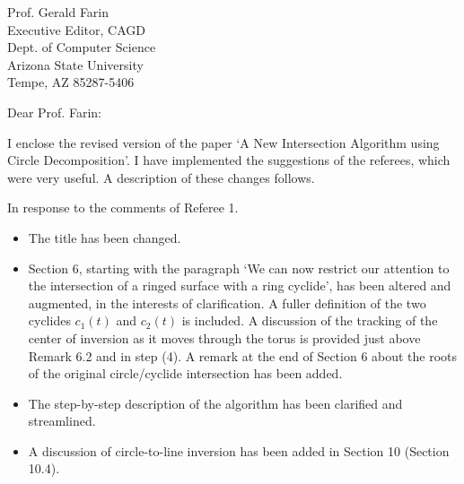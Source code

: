 \signature{Prof. John K. Johnstone\\jj@cs.jhu.edu}

\begin{letter}
{Prof. Gerald Farin\\
Executive Editor, CAGD\\
Dept. of Computer Science\\
Arizona State University\\
Tempe, AZ 85287-5406
}

\opening{Dear Prof. Farin:}

I enclose the revised version of the paper `A New Intersection Algorithm using
Circle Decomposition'.  I have implemented the suggestions of the referees,
which were very useful. A description of these changes follows.

\noindent In response to the comments of Referee 1.
\begin{itemize}
\item
	The title has been changed.
\item
	Section 6, starting with the paragraph `We can now restrict our
	attention to the intersection of a ringed surface with a ring
	cyclide', has been altered and augmented,
	in the interests of clarification.
	A fuller definition of the two cyclides $c_1(t)$ and $c_2(t)$
	is included.
	A discussion of the tracking of the center of inversion
	as it moves through the torus is provided just above Remark 6.2
	and in step (4).
	A remark at the end of Section 6 about the roots of the original
	circle/cyclide intersection has been added.
\item
	The step-by-step description of the algorithm has been clarified
	and streamlined.
\item
	A discussion of circle-to-line inversion has been added in 
	Section 10 (Section 10.4).
\end{itemize}


\end{letter}
